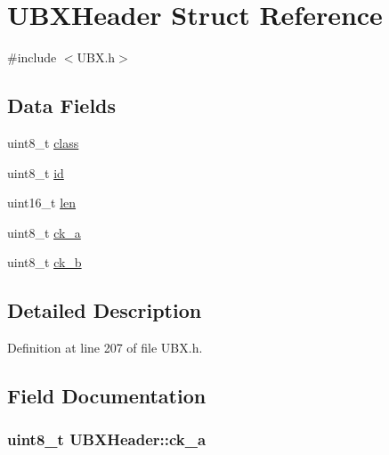 \hypertarget{struct_u_b_x_header}{\section{\-U\-B\-X\-Header \-Struct \-Reference}
\label{struct_u_b_x_header}
}


{\ttfamily \#include $<$\-U\-B\-X.\-h$>$}

\subsection*{\-Data \-Fields}
\begin{DoxyCompactItemize}
\item 
uint8\-\_\-t \hyperlink{struct_u_b_x_header_ab7410b764b3d80030e5a8e5167831303}{class}
\item 
uint8\-\_\-t \hyperlink{struct_u_b_x_header_ae65b35dcbe44c08985ab3ba9e1e04793}{id}
\item 
uint16\-\_\-t \hyperlink{struct_u_b_x_header_ac3357d02e8f968e15c24c81716054a85}{len}
\item 
uint8\-\_\-t \hyperlink{struct_u_b_x_header_a151b080d3305855bcf4fb0c8042d6b7e}{ck\-\_\-a}
\item 
uint8\-\_\-t \hyperlink{struct_u_b_x_header_a5fe662d32012b4caaca9b027df4a3d30}{ck\-\_\-b}
\end{DoxyCompactItemize}


\subsection{\-Detailed \-Description}


\-Definition at line 207 of file \-U\-B\-X.\-h.



\subsection{\-Field \-Documentation}
\hypertarget{struct_u_b_x_header_a151b080d3305855bcf4fb0c8042d6b7e}{
\subsubsection[{ck\-\_\-a}]{\setlength{\rightskip}{0pt plus 5cm}uint8\-\_\-t {\bf \-U\-B\-X\-Header\-::ck\-\_\-a}}}\label{struct_u_b_x_header_a151b080d3305855bcf4fb0c8042d6b7e}



